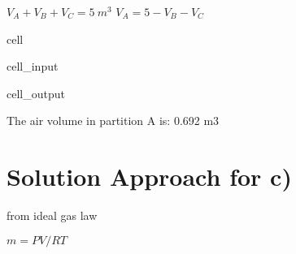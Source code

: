 \documentclass[letterpaper,10pt,english]{jupyterBook}
\begin{document}
\sphinxAtStartPar
\(V_A+V_B+V_C=5\:m^3\) 
\(V_A=5-V_B-V_C\)

\begin{sphinxuseclass}{cell}\begin{sphinxVerbatimInput}

\begin{sphinxuseclass}{cell_input}
\begin{sphinxVerbatim}[commandchars=\\\{\}]
   
      
  
\end{sphinxVerbatim}

\end{sphinxuseclass}\end{sphinxVerbatimInput}
\begin{sphinxVerbatimOutput}

\begin{sphinxuseclass}{cell_output}
\begin{sphinxVerbatim}[commandchars=\\\{\}]
The air volume in partition A is: 0.692 m3
\end{sphinxVerbatim}

\end{sphinxuseclass}\end{sphinxVerbatimOutput}

\end{sphinxuseclass}

\section{Solution Approach for c)}
\label{\detokenize{notebooks/Chapter3/CH3-Q2_v1:solution-approach-for-c}}
\sphinxAtStartPar
from ideal gas law

\sphinxAtStartPar
\(m=PV/{RT}\)
\end{document}
